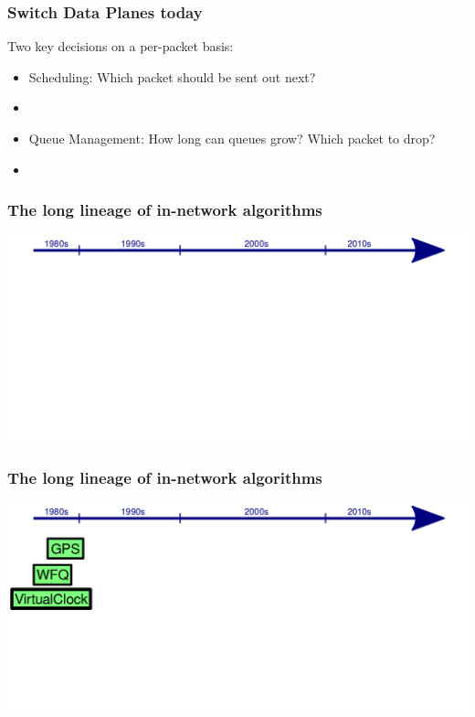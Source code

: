 \begin{frame}[plain]
\frametitle{Switch Data Planes today}
Two key decisions on a per-packet basis:
\begin{itemize}
\item Scheduling: Which packet should be sent out next?
\item[]
\item Queue Management: How long can queues grow? Which packet to drop?
\item[]
\end{itemize}
\end{frame}

\begin{frame}[plain]
\frametitle{The long lineage of in-network algorithms}
\begin{center}
\noindent \hspace{-.75 cm} \includegraphics[width=.9\textwidth]{march-4.png}
\end{center}
\end{frame}


\begin{frame}[plain]
\frametitle{The long lineage of in-network algorithms}
\begin{center}
\noindent \hspace{-.75 cm} \includegraphics[width=.9\textwidth]{march-3.png}
\end{center}
\end{frame}

